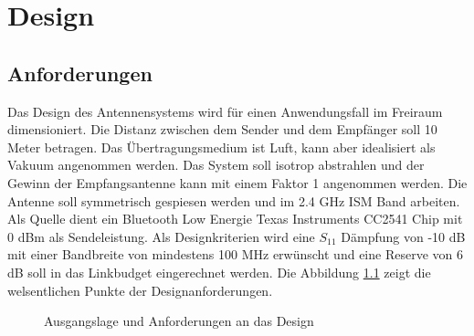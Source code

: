 \newpage 
\chapter{Design}

\section{Anforderungen}
Das Design des Antennensystems wird für einen Anwendungsfall im Freiraum dimensioniert. Die Distanz zwischen dem Sender und dem Empfänger soll 10 Meter betragen. Das Übertragungsmedium ist Luft, kann aber idealisiert als Vakuum angenommen werden. Das System soll isotrop abstrahlen und der Gewinn der Empfangsantenne kann mit einem Faktor  1 angenommen werden. Die Antenne soll symmetrisch gespiesen werden und im 2.4 GHz ISM Band arbeiten. Als Quelle dient ein Bluetooth Low Energie Texas Instruments CC2541 Chip mit 0 dBm als Sendeleistung. Als Designkriterien wird eine $S_{11}$ Dämpfung von -10 dB mit einer Bandbreite von mindestens 100 MHz erwünscht und eine Reserve von 6 dB soll in das Linkbudget eingerechnet werden. Die Abbildung \ref{fig:DesignAusgangslage} zeigt die welsentlichen Punkte der Designanforderungen.

\begin{figure}[!ht]
\begin{center}
\end{center}
\caption{Ausgangslage und Anforderungen an das Design}
\label{fig:DesignAusgangslage}
\end{figure}

